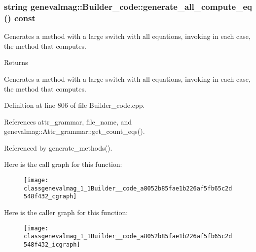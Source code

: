 \hypertarget{classgenevalmag_1_1Builder__code_a8052b85fae1b226af5fb65c2d548f432}{
\subsubsection[{generate\_\-all\_\-compute\_\-eq}]{\setlength{\rightskip}{0pt plus 5cm}string genevalmag::Builder\_\-code::generate\_\-all\_\-compute\_\-eq () const}}
\label{classgenevalmag_1_1Builder__code_a8052b85fae1b226af5fb65c2d548f432}
Generates a method with a large switch with all equations, invoking in each case, the method that computes. \begin{DoxyReturn}{Returns}

\end{DoxyReturn}
Generates a method with a large switch with all equations, invoking in each case, the method that computes. 

Definition at line 806 of file Builder\_\-code.cpp.



References attr\_\-grammar, file\_\-name, and genevalmag::Attr\_\-grammar::get\_\-count\_\-eqs().



Referenced by generate\_\-methods().



Here is the call graph for this function:\nopagebreak
\begin{figure}[H]
\begin{center}
\leavevmode
\texttt{[image: classgenevalmag\_1\_1Builder\_\_code\_a8052b85fae1b226af5fb65c2d548f432\_cgraph]}
\end{center}
\end{figure}




Here is the caller graph for this function:\nopagebreak
\begin{figure}[H]
\begin{center}
\leavevmode
\texttt{[image: classgenevalmag\_1\_1Builder\_\_code\_a8052b85fae1b226af5fb65c2d548f432\_icgraph]}
\end{center}
\end{figure}



